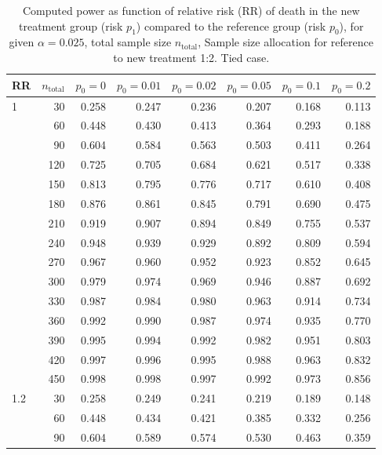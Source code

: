 \documentclass[bimj,fleqn]{w-art}\usepackage[]{graphicx}\usepackage[]{color}
\theoremstyle{plain}
\theoremstyle{definition}
\begin{document}
\begin{table}[ht]
\centering
\caption{Computed power as function of relative risk
             (RR) of death in the new treatment group (risk $p_1$) compared to
             the reference group (risk $p_0$), for given $\alpha =0.025$,
             total sample size $n_{\text{total}}$, Sample size allocation for
             reference to new treatment 1:2. Tied case.} 
\label{tab:AppendixTied}
\begin{tabular}{lrrrrrrr}
  \hline
RR & $n_{\text{total}}$ & $p_0 = 0$ & $p_0 = 0.01$ & $p_0 = 0.02$ & $p_0 = 0.05$ & $p_0 = 0.1$ & $p_0 = 0.2$ \\ 
  \hline
1 & 30 & 0.258 & 0.247 & 0.236 & 0.207 & 0.168 & 0.113 \\ 
   & 60 & 0.448 & 0.430 & 0.413 & 0.364 & 0.293 & 0.188 \\ 
   & 90 & 0.604 & 0.584 & 0.563 & 0.503 & 0.411 & 0.264 \\ 
   & 120 & 0.725 & 0.705 & 0.684 & 0.621 & 0.517 & 0.338 \\ 
   & 150 & 0.813 & 0.795 & 0.776 & 0.717 & 0.610 & 0.408 \\ 
   & 180 & 0.876 & 0.861 & 0.845 & 0.791 & 0.690 & 0.475 \\ 
   & 210 & 0.919 & 0.907 & 0.894 & 0.849 & 0.755 & 0.537 \\ 
   & 240 & 0.948 & 0.939 & 0.929 & 0.892 & 0.809 & 0.594 \\ 
   & 270 & 0.967 & 0.960 & 0.952 & 0.923 & 0.852 & 0.645 \\ 
   & 300 & 0.979 & 0.974 & 0.969 & 0.946 & 0.887 & 0.692 \\ 
   & 330 & 0.987 & 0.984 & 0.980 & 0.963 & 0.914 & 0.734 \\ 
   & 360 & 0.992 & 0.990 & 0.987 & 0.974 & 0.935 & 0.770 \\ 
   & 390 & 0.995 & 0.994 & 0.992 & 0.982 & 0.951 & 0.803 \\ 
   & 420 & 0.997 & 0.996 & 0.995 & 0.988 & 0.963 & 0.832 \\ 
   & 450 & 0.998 & 0.998 & 0.997 & 0.992 & 0.973 & 0.856 \\ 
  1.2 & 30 & 0.258 & 0.249 & 0.241 & 0.219 & 0.189 & 0.148 \\ 
   & 60 & 0.448 & 0.434 & 0.421 & 0.385 & 0.332 & 0.256 \\ 
   & 90 & 0.604 & 0.589 & 0.574 & 0.530 & 0.463 & 0.359 \\ 

\end{tabular}
\end{table}
\end{document}
